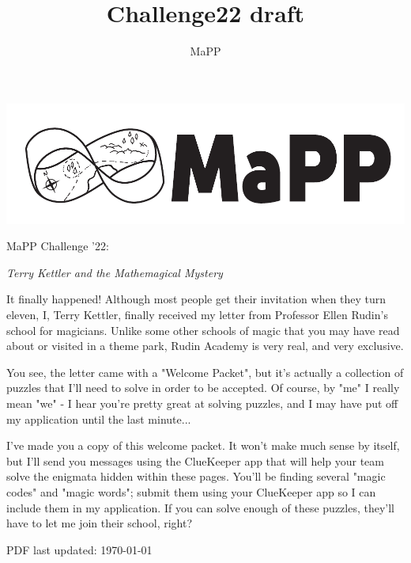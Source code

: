 \documentclass{article}
\title{Challenge22 draft}
\author{MaPP}
\begin{document}

\thispagestyle{empty}
\begin{center}
\includegraphics[width=0.8\linewidth]{banner_bw}

\Large MaPP Challenge '22:

\textit{Terry Kettler and the Mathemagical Mystery}

\end{center}

\vspace{1in}

It finally happened! Although most people get their invitation
when they turn eleven, I, Terry Kettler, finally received my
letter from Professor Ellen Rudin's school for magicians.
Unlike some other schools of magic that you may have read about
or visited in a theme park, Rudin Academy is very real, and
very exclusive.

You see, the letter came with a "Welcome Packet", but it's actually
a collection of puzzles that I'll need to solve in order to be
accepted. Of course, by "me" I really mean "we" - I hear you're
pretty great at solving puzzles, and I may have put off my application
until the last minute...

I've made you a copy of this welcome packet. It won't
make much sense by itself, but I'll send you messages using the
ClueKeeper app that will help your team solve the enigmata hidden within
these pages. You'll be finding several "magic codes"
and "magic words"; submit them using your ClueKeeper app so I can
include them in my application.
If you can solve enough of these puzzles, they'll have to let me join their
school, right?



\begin{center}

\end{center}

\vfill

{\footnotesize PDF last updated: \today}
\end{document}
